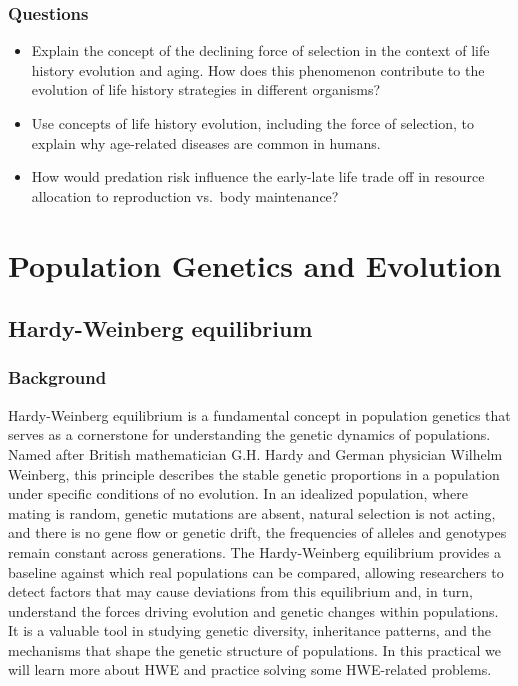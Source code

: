 \documentclass[
  a4paper]{book}
\providecommand{\tightlist}{%
  \setlength{\itemsep}{0pt}\setlength{\parskip}{0pt}}
\begin{document}
\hypertarget{questions-5}{%
\section{Questions}\label{questions-5}}

\begin{itemize}
\tightlist
\item
  Explain the concept of the declining force of selection in the context of life history evolution and aging. How does this phenomenon contribute to the evolution of life history strategies in different organisms?
\item
  Use concepts of life history evolution, including the force of selection, to explain why age-related diseases are common in humans.
\item
  How would predation risk influence the early-late life trade off in resource allocation to reproduction vs.~body maintenance?
\end{itemize}

\hypertarget{part-population-genetics-and-evolution}{%
\part{Population Genetics and Evolution}\label{part-population-genetics-and-evolution}}

\hypertarget{hardy-weinberg-equilibrium}{%
\chapter{Hardy-Weinberg equilibrium}\label{hardy-weinberg-equilibrium}}

\hypertarget{background-9}{%
\section{Background}\label{background-9}}

Hardy-Weinberg equilibrium is a fundamental concept in population genetics that serves as a cornerstone for understanding the genetic dynamics of populations. Named after British mathematician G.H. Hardy and German physician Wilhelm Weinberg, this principle describes the stable genetic proportions in a population under specific conditions of no evolution. In an idealized population, where mating is random, genetic mutations are absent, natural selection is not acting, and there is no gene flow or genetic drift, the frequencies of alleles and genotypes remain constant across generations. The Hardy-Weinberg equilibrium provides a baseline against which real populations can be compared, allowing researchers to detect factors that may cause deviations from this equilibrium and, in turn, understand the forces driving evolution and genetic changes within populations. It is a valuable tool in studying genetic diversity, inheritance patterns, and the mechanisms that shape the genetic structure of populations. In this practical we will learn more about HWE and practice solving some HWE-related problems.
\end{document}
